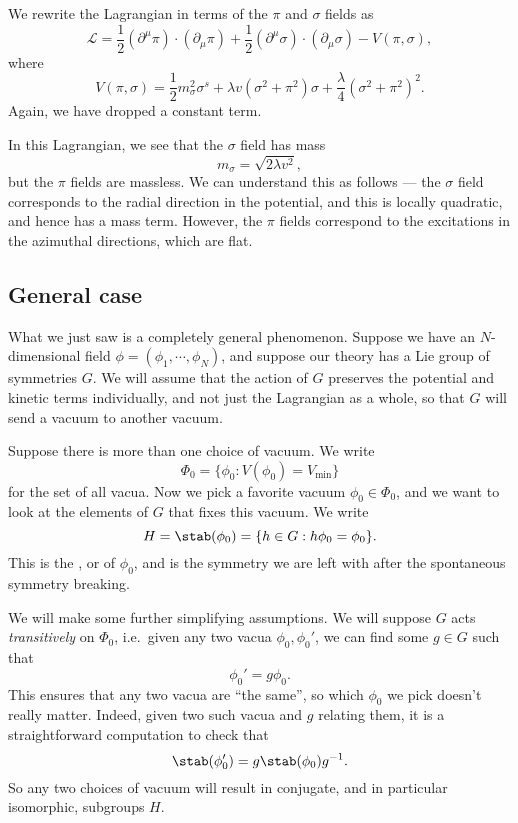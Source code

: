 \documentclass[a4paper]{article}
\begin{document}
We rewrite the Lagrangian in terms of the $\pi$ and $\sigma$ fields as
\[
  \mathcal{L} = \frac{1}{2}(\partial^\mu \pi) \cdot (\partial_\mu \pi) + \frac{1}{2}(\partial^\mu \sigma) \cdot (\partial_\mu \sigma) - V(\pi, \sigma),
\]
where
\[
  V(\pi, \sigma) = \frac{1}{2} m_\sigma^2 \sigma^s + \lambda v(\sigma^2 + \pi^2) \sigma + \frac{\lambda}{4}(\sigma^2 + \pi^2)^2.
\]
Again, we have dropped a constant term.

In this Lagrangian, we see that the $\sigma$ field has mass
\[
  m_\sigma = \sqrt{2\lambda v^2},
\]
but the $\pi$ fields are massless. We can understand this as follows --- the $\sigma$ field corresponds to the radial direction in the potential, and this is locally quadratic, and hence has a mass term. However, the $\pi$ fields correspond to the excitations in the azimuthal directions, which are flat.

\subsection{General case}
What we just saw is a completely general phenomenon. Suppose we have an $N$-dimensional field $\phi = (\phi_1, \cdots, \phi_N)$, and suppose our theory has a Lie group of symmetries $G$. We will assume that the action of $G$ preserves the potential and kinetic terms individually, and not just the Lagrangian as a whole, so that $G$ will send a vacuum to another vacuum.

Suppose there is more than one choice of vacuum. We write
\[
  \Phi_0 = \{\phi_0: V(\phi_0) = V_{\mathrm{min}}\}
\]
for the set of all vacua. Now we pick a favorite vacuum $\phi_0 \in \Phi_0$, and we want to look at the elements of $G$ that fixes this vacuum. We write
\[
  H = \stab(\phi_0) = \{h \in G: h \phi_0 = \phi_0\}.
\]
This is the , or  of $\phi_0$, and is the symmetry we are left with after the spontaneous symmetry breaking.

We will make some further simplifying assumptions. We will suppose $G$ acts \emph{transitively} on $\Phi_0$, i.e.\ given any two vacua $\phi_0, \phi_0'$, we can find some $g \in G$ such that
\[
  \phi_0' = g \phi_0.
\]
This ensures that any two vacua are ``the same'', so which $\phi_0$ we pick doesn't really matter. Indeed, given two such vacua and $g$ relating them, it is a straightforward computation to check that
\[
  \stab(\phi_0') = g \stab(\phi_0) g^{-1}.
\]
So any two choices of vacuum will result in conjugate, and in particular isomorphic, subgroups $H$.
\end{document}
